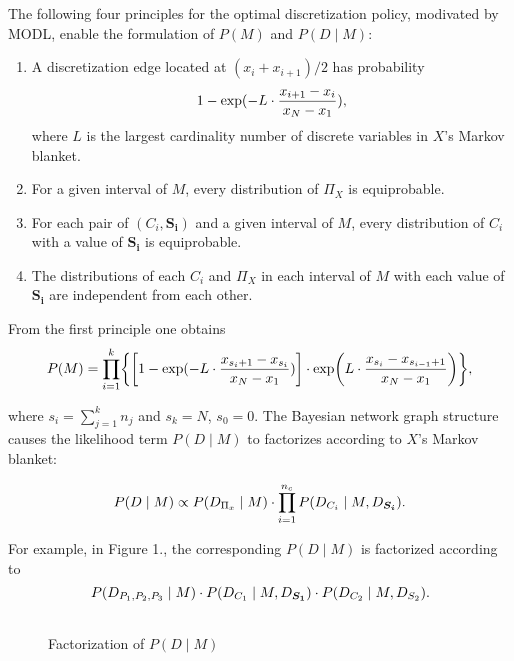 The following four principles for the optimal discretization policy, modivated by MODL, enable the formulation of $P(M)$ and $P(D \mid M)$:
\begin{enumerate}
\item A discretization edge located at $(x_i + x_{i+1})/2$ has probability
\begin{equation}
1 - {\exp(- L \cdot {{x_{i+1} - x_i}\over{x_N - x_1}})},
\end{equation}
where $L$ is the largest cardinality number of discrete variables in $X$'s Markov blanket. 
\item For a given interval of $M$, every distribution of $\Pi_X$ is equiprobable.
\item For each pair of $(C_i,\boldsymbol{S_i})$ and a given interval of $M$, every distribution of $C_i$ with a value of $\boldsymbol{S_i}$ is equiprobable.
\item The distributions of each $C_i$ and $\Pi_X$ in each interval of $M$ with each value of $\boldsymbol{S_i}$ are independent from each other.
\end{enumerate}

From the first principle one obtains
\begin{equation}
P(M) = \prod_{i=1}^k \curly{ \brock{1 - {\exp(- L \cdot {{x_{s_i+1} - x_{s_i}}\over{x_N - x_1}})}} \cdot \exp\paren{L \cdot {{x_{s_{i}} - x_{s_{i-1} + 1}}\over{x_N - x_1}}}},
\end{equation}

\noindent
where $s_i = \sum_{j=1}^k n_j$ and $s_k = N$, $s_0 = 0$.
The Bayesian network graph structure causes the likelihood term $P(D \mid M)$ to factorizes according to $X$'s Markov blanket:

\begin{equation}
P\paren{D \mid M} \propto P\paren{D_{\Pi_x} \mid M} \cdot \prod_{i = 1}^{n_c} P\paren{D_{C_i} \mid M, D_{\boldsymbol{S_i}}}\text{.}
\end{equation}

For example, in Figure 1., the corresponding $P(D \mid M)$ is factorized according to
\begin{equation}
P\paren{D_{ P_1,P_2,P_3 } \mid M} \cdot P\paren{ D_{ C_1 } \mid M,D_{\boldsymbol{S_1}}} \cdot P\paren{D_{C_2} \mid M,D_{ S_2  }}\text{.}
\end{equation}

\begin{figure}[ht]
    \begin{tabular}{cc}
      
    \end{tabular}
  \caption{Factorization of $P(D \mid M)$}
\end{figure}


